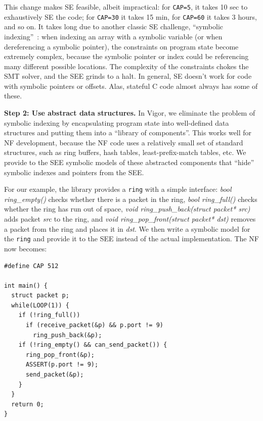 \documentclass[letterpaper,twocolumn,10pt]{article}
\newcommand{\code}[1]{\texttt{#1}}
\begin{document}
This change makes SE feasible, albeit impractical: for \code{CAP=5}, it takes 10 sec to exhaustively SE the code; for \code{CAP=30} it takes 15 min, for \code{CAP=60} it takes 3 hours, and so on. It takes long due to another classic SE challenge, ``symbolic indexing''~\cite{sen2005cute,godefroid2008automated,boonstoppel2008rwset}: when indexing an array with a symbolic variable (or when dereferencing a symbolic pointer), the constraints on program state become extremely complex, because the symbolic pointer or index could be referencing many different possible locations. The complexity of the constraints chokes the SMT solver, and the SEE grinds to a halt. In general, SE doesn't work for code with symbolic pointers or offsets. Alas, stateful C code almost always has some of these.

{\bf Step 2: Use abstract data structures.} In Vigor, we eliminate the problem of symbolic indexing by encapsulating program state into well-defined data structures and putting them into a ``library of components''. This works well for NF development, because the NF code uses a relatively small set of standard structures, such as ring buffers, hash tables, least-prefix-match tables, etc. We provide to the SEE symbolic models of these abstracted components that ``hide'' symbolic indexes and pointers from the SEE.

For our example, the library provides a \code{ring} with a simple interface: {\em bool ring\_empty()} checks whether there is a packet in the ring, {\em bool ring\_full()} checks whether the ring has run out of space, {\em void ring\_push\_back(struct packet* src)} adds packet {\em src} to the ring, and {\em void ring\_pop\_front(struct packet* dst)} removes a packet from the ring and places it in {\em dst}. We then write a symbolic model for the \code{ring} and provide it to the SEE instead of the actual implementation. The NF now becomes:





\begin{lstlisting}
#define CAP 512

int main() {
  struct packet p;
  while(LOOP(1)) {
    if (!ring_full())
      if (receive_packet(&p) && p.port != 9)
        ring_push_back(&p);
    if (!ring_empty() && can_send_packet()) {
      ring_pop_front(&p);
      ASSERT(p.port != 9);
      send_packet(&p);
    }
  }
  return 0;
}
\end{lstlisting}
\end{document}
